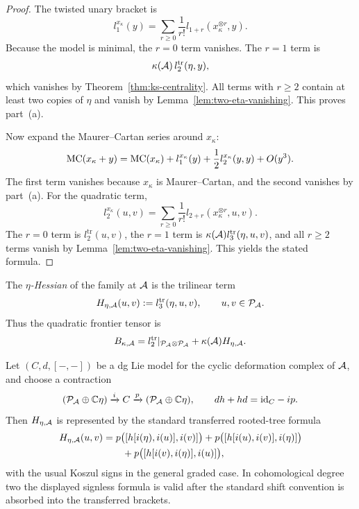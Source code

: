 \begin{proof}
The twisted unary bracket is
\[
l_1^{x_\kappa}(y)=\sum_{r\ge 0}\frac{1}{r!}l_{1+r}(x_\kappa^{\otimes r},y).
\]
Because the model is minimal, the $r=0$ term vanishes.  The $r=1$ term is
\[
\kappa(\mathcal{A})\,l_2^{\mathrm{tr}}(\eta,y),
\]
which vanishes by Theorem~\ref{thm:ks-centrality}.  All terms with $r\ge 2$
contain at least two copies of $\eta$ and vanish by
Lemma~\ref{lem:two-eta-vanishing}.  This proves part~\textup{(a)}.

Now expand the Maurer--Cartan series around $x_\kappa$:
\[
\mathrm{MC}(x_\kappa+y)=\mathrm{MC}(x_\kappa)+l_1^{x_\kappa}(y)+\frac12l_2^{x_\kappa}(y,y)+O(y^3).
\]
The first term vanishes because $x_\kappa$ is Maurer--Cartan, and the second
vanishes by part~\textup{(a)}.  For the quadratic term,
\[
l_2^{x_\kappa}(u,v)=\sum_{r\ge 0}\frac{1}{r!}l_{2+r}(x_\kappa^{\otimes r},u,v).
\]
The $r=0$ term is $l_2^{\mathrm{tr}}(u,v)$, the $r=1$ term is
$\kappa(\mathcal{A})l_3^{\mathrm{tr}}(\eta,u,v)$, and all $r\ge 2$ terms vanish by
Lemma~\ref{lem:two-eta-vanishing}.  This yields the stated formula.\end{proof}

\begin{definition}
\label{def:eta-hessian}
The \emph{$\eta$-Hessian} of the family at $\mathcal{A}$ is the trilinear term
\[
H_{\eta,\mathcal{A}}(u,v):=l_3^{\mathrm{tr}}(\eta,u,v),
\qquad u,v\in \mathcal{P}_{\mathcal{A}}.
\]
Thus the quadratic frontier tensor is
\[
B_{\kappa,\mathcal{A}}=l_2^{\mathrm{tr}}|_{\mathcal{P}_{\mathcal{A}}\otimes \mathcal{P}_{\mathcal{A}}}
+\kappa(\mathcal{A})H_{\eta,\mathcal{A}}.
\]
\end{definition}

\begin{proposition}
\label{prop:eta-hessian-transfer}
Let $(C,d,[-,-])$ be a dg Lie model for the cyclic deformation complex of
$\mathcal{A}$, and choose a contraction
\[
(\mathcal{P}_{\mathcal{A}}\oplus \mathbb{C}\eta) \xrightarrow{i} C \xrightarrow{p} (\mathcal{P}_{\mathcal{A}}\oplus \mathbb{C}\eta),
\qquad dh+hd=\mathrm{id}_C-ip.
\]
Then $H_{\eta,\mathcal{A}}$ is represented by the standard transferred rooted-tree
formula
\begin{align*}
H_{\eta,\mathcal{A}}(u,v)
&=p\bigl([h[i(\eta),i(u)],i(v)]\bigr)
 +p\bigl([h[i(u),i(v)],i(\eta)]\bigr) \\
&\qquad
 +p\bigl([h[i(v),i(\eta)],i(u)]\bigr),
\end{align*}
with the usual Koszul signs in the general graded case.  In cohomological
degree two the displayed signless formula is valid after the standard shift
convention is absorbed into the transferred brackets.
\end{proposition}

